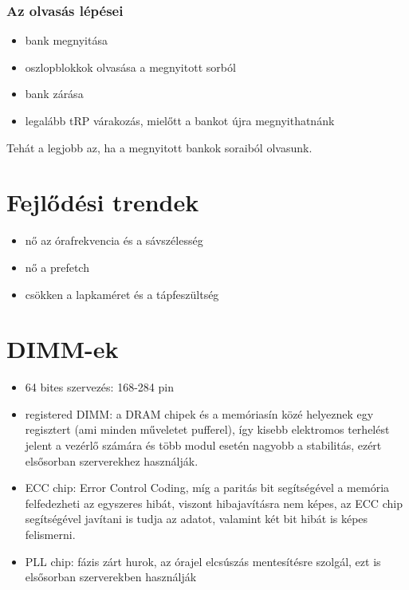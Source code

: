 \subsubsection{Az olvasás lépései}
\begin{itemize}
    \item bank megnyitása
    \item oszlopblokkok olvasása a megnyitott sorból
    \item bank zárása
    \item legalább tRP várakozás, mielőtt a bankot újra megnyithatnánk
\end{itemize}
Tehát a legjobb az, ha a megnyitott bankok soraiból olvasunk.

\section{Fejlődési trendek}
\begin{itemize}
    \item nő az órafrekvencia és a sávszélesség
    \item nő a prefetch
    \item csökken a lapkaméret és a tápfeszültség
\end{itemize}

\section{DIMM-ek}
\begin{itemize}
    \item 64 bites szervezés: 168-284 pin
    \item registered DIMM: a DRAM chipek és a memóriasín közé helyeznek egy regisztert (ami minden műveletet pufferel), így kisebb elektromos terhelést jelent a vezérlő számára és több modul esetén nagyobb a stabilitás, ezért elsősorban szerverekhez használják.
    \item ECC chip: Error Control Coding, míg a paritás bit segítségével a memória felfedezheti az egyszeres hibát, viszont hibajavításra nem képes, az ECC chip segítségével javítani is tudja az adatot, valamint két bit hibát is képes felismerni.
    \item PLL chip: fázis zárt hurok, az órajel elcsúszás mentesítésre szolgál, ezt is elsősorban szerverekben használják
\end{itemize}

